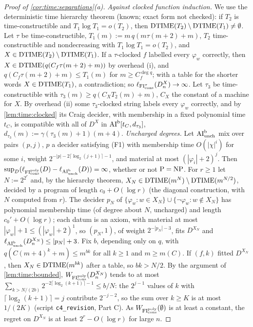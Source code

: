 \begin{proof}[Proof of \cref{cor:time:separations}(a)]
\emph{Against clocked function induction.} We use the deterministic time hierarchy theorem \citep{hartmanis1965computational,hennie1966two} (known; exact form not checked): if $T_2$ is time-constructible and $T_1\log T_1=o(T_2)$, then $\mathrm{DTIME}(T_2)\setminus\mathrm{DTIME}(T_1)\ne\emptyset$. Let $\tau$ be time-constructible, $T_1(m):=m\,q(m\tau(m+2)+m)$, $T_2$ time-constructible and nondecreasing with $T_1\log T_1=o(T_2)$, and $X\in\mathrm{DTIME}(T_2)\setminus\mathrm{DTIME}(T_1)$. If a $\tau$-clocked $f$ labelled every $\varphi_w$ correctly, then $X\in\mathrm{DTIME}(q(C_f\tau(m+2)+m))$ by overhead (i), and $q(C_f\tau(m+2)+m)\le T_1(m)$ for $m\ge C_f^{\deg q}$; with a table for the shorter words $X\in\mathrm{DTIME}(T_1)$, a contradiction; so $\ell_{\mathrm{FI}_{\mathrm{cons}}^\tau}(D^X_n)\to\infty$. Let $\tau_3$ be time-constructible with $\tau_3(m)\ge q(C_XT_2(m)+m)$, $C_X$ the constant of a machine for $X$. By overhead (ii) some $\tau_3$-clocked string labels every $\varphi_w$ correctly, and by \cref{lem:time:clocked} its Craig decider, with membership in a fixed polynomial time $t_C$, is compatible with all of $D^X$ in $\mathrm{AI}^{\mathrm b}[t_C,d_{\tau_3}]$, $d_{\tau_3}(m):=\gamma(\tau_3(m)+1)(m+4)$.
\emph{Uncharged degrees.} Let $\mathrm{AI}^{\mathrm b}_{\mathrm{unch}}$ mix over pairs $(p,j)$, $p$ a decider satisfying (F1) with membership time $O(|\chi|^i)$ for some $i$, weight $2^{-|p|-2\lceil\log_2(j+1)\rceil-1}$, and material at most $(|\varphi_i|+2)^j$. Then $\sup_D(\ell_{\mathrm{FI}_{\mathrm{cons}}^{\mathrm{poly}}}(D)-\ell_{\mathrm{AI}^{\mathrm b}_{\mathrm{unch}}}(D))=\infty$, whether or not $\mathrm{P}=\mathrm{NP}$. For $r\ge1$ let $N:=2^{2^r}$ and, by the hierarchy theorem, $X_N\in\mathrm{DTIME}(m^N)\setminus\mathrm{DTIME}(m^{N/2})$, decided by a program of length $c_0+O(\log r)$ (the diagonal construction, with $N$ computed from $r$). The decider $p_N$ of $\{\varphi_w:w\in X_N\}\cup\{\neg\varphi_w:w\notin X_N\}$ has polynomial membership time (of degree about $N$, uncharged) and length $c_0'+O(\log r)$; each datum is an axiom, with material at most $|\varphi_w|+1\le(|\varphi_w|+2)^1$, so $(p_N,1)$, of weight $2^{-|p_N|-3}$, fits $D^{X_N}$ and $\ell_{\mathrm{AI}^{\mathrm b}_{\mathrm{unch}}}(D^{X_N}_n)\le|p_N|+3$. Fix $b$, depending only on $q$, with $q(C(m+4)^k+m)\le m^{bk}$ for all $k\ge1$ and $m\ge m(C)$. If $(f,k)$ fitted $D^{X_N}$, then $X_N\in\mathrm{DTIME}(m^{bk})$ after a table, so $bk>N/2$. By the argument of \cref{lem:time:bounded}, $W_{\mathrm{FI}_{\mathrm{cons}}^{\mathrm{poly}}}(D^{X_N}_n)$ tends to at most $\sum_{k>N/(2b)}2^{-2\lceil\log_2(k+1)\rceil-1}\le b/N$: the $2^{j-1}$ values of $k$ with $\lceil\log_2(k+1)\rceil=j$ contribute $2^{-j-2}$, so the sum over $k\ge K$ is at most $1/(2K)$ (script \texttt{c4\_revision}, Part C). As $W_{\mathrm{FI}_{\mathrm{cons}}^{\mathrm{poly}}}(\emptyset)$ is at least a constant, the regret on $D^{X_N}$ is at least $2^r-O(\log r)$ for large $n$.
\end{proof}

